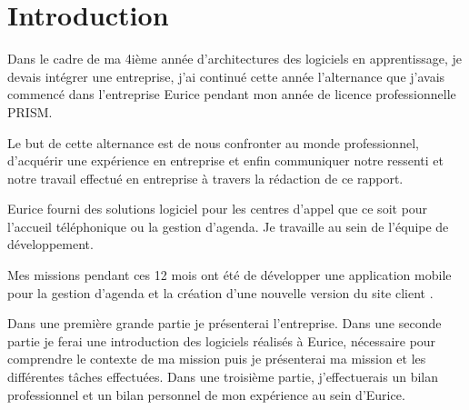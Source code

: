 \chapter{Introduction}

Dans le cadre de ma 4ième année d'architectures des logiciels en apprentissage, 
je devais intégrer une entreprise, j'ai continué cette année l'alternance que j'avais commencé 
dans l'entreprise Eurice pendant mon année de licence professionnelle PRISM.\newline

Le but de cette alternance est de nous confronter au monde professionnel, 
d’acquérir une expérience en entreprise et enfin communiquer notre ressenti et 
notre travail effectué en entreprise à travers la rédaction de ce rapport. \newline

Eurice fourni des solutions logiciel pour les centres d'appel 
que ce soit pour l'accueil téléphonique ou la gestion d'agenda. 
Je travaille au sein de l’équipe de développement. 

Mes missions pendant ces 12 mois ont été de développer une application mobile pour la gestion d'agenda et
la création d'une nouvelle version du site client . \newline

Dans une première grande partie je présenterai l’entreprise. 
Dans une seconde partie je ferai une introduction des logiciels réalisés à Eurice, nécessaire pour comprendre le contexte de ma mission 
puis je présenterai ma mission et les différentes tâches effectuées.
Dans une troisième partie, j'effectuerais un bilan professionnel et un bilan personnel de mon expérience au sein d'Eurice. \newline
\newpage 


